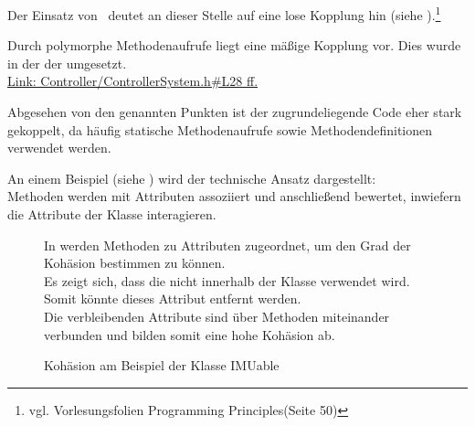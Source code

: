 
Der Einsatz von \ROS\ deutet an dieser Stelle auf eine lose Kopplung hin (siehe ).\footnote{vgl. Vorlesungsfolien \glq Programming Principles\grq (Seite 50)} 

Durch polymorphe Methodenaufrufe liegt eine mäßige Kopplung vor. Dies wurde in der  der  umgesetzt.\\
\href{https://github.com/MobMonRob/ROSLabDrohne/blob/8b5d30dbdfbd41a7e10fa8d512db42cad5bb6d16/Code/Controller/include/Controller/ControllerSystem.h\#L28}{Link: Controller/ControllerSystem.h\#L28 ff.}


Abgesehen von den genannten Punkten ist der zugrundeliegende Code eher stark gekoppelt, da häufig statische Methodenaufrufe sowie Methodendefinitionen verwendet werden.


An einem Beispiel (siehe ) wird der technische Ansatz dargestellt:\\
Methoden werden mit Attributen assoziiert und anschließend bewertet, inwiefern die Attribute der Klasse interagieren.

\begin{figure}[ht!]
\vspace{0.25cm}
\begin{center}
\caption{Kohäsion am Beispiel der Klasse IMUable}
\label{fig:Cohe}
\end{center}

\vspace{0.25cm}
In  werden Methoden zu Attributen zugeordnet, um den Grad der Kohäsion bestimmen zu können.\\
Es zeigt sich, dass die  nicht innerhalb der Klasse verwendet wird. Somit könnte dieses Attribut entfernt werden.\\
Die verbleibenden Attribute sind über Methoden miteinander verbunden und bilden somit eine hohe Kohäsion ab.
\end{figure}









